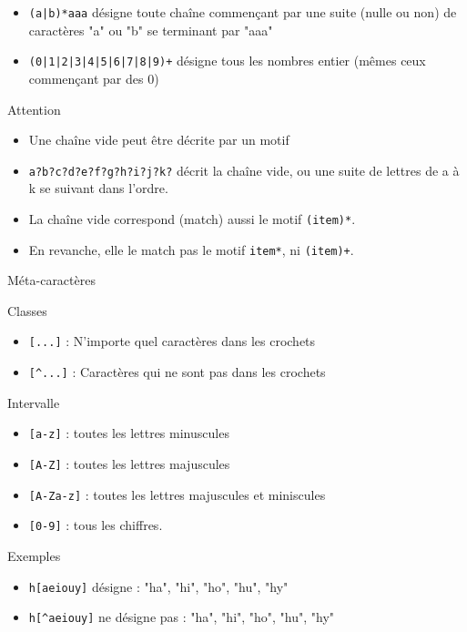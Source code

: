 \begin{frame}[containsverbatim]{\ftitle}
\begin{block}{\blocktitle}
\begin{itemize}
\item \verb!(a|b)*aaa! désigne toute chaîne commençant par une suite (nulle ou non) de caractères "a" ou "b" se terminant par "aaa"
\item \verb!(0|1|2|3|4|5|6|7|8|9)+! désigne tous les nombres entier (mêmes ceux commençant par des 0)
\end{itemize}
\end{block}

\def\blocktitle{Attention}
\begin{alertblock}{\blocktitle}
\begin{itemize}
\item Une chaîne vide peut être décrite par un motif
\item \verb!a?b?c?d?e?f?g?h?i?j?k?! décrit la chaîne vide, ou une suite de lettres de a à k se suivant dans l'ordre.
\item La chaîne vide correspond (match) aussi le motif \verb!(item)*!.
\item En revanche, elle le match pas le motif \verb!item*!, ni \verb!(item)+!.
\end{itemize}
\end{alertblock}
\end{frame}

\def\ftitle{Méta-caractères}
\begin{frame}[containsverbatim]{\ftitle}
\def\blocktitle{Classes}
\begin{block}{\blocktitle}
\begin{itemize}
\item \verb![...]! : N'importe quel caractères dans les crochets
\item \verb![^...]! : Caractères qui ne sont pas dans les crochets
\end{itemize}
\end{block}

\def\blocktitle{Intervalle}
\begin{block}{\blocktitle}
\begin{itemize}
\item \verb![a-z]! : toutes les lettres minuscules
\item \verb![A-Z]! : toutes les lettres majuscules
\item \verb![A-Za-z]! : toutes les lettres majuscules et miniscules
\item \verb![0-9]! : tous les chiffres.
\end{itemize}
\end{block}

\def\blocktitle{Exemples}
\begin{exampleblock}{\blocktitle}
\begin{itemize}
\item \verb!h[aeiouy]! désigne : "ha", "hi", "ho", "hu", "hy"
\item \verb!h[^aeiouy]! ne désigne pas : "ha", "hi", "ho", "hu", "hy"
\end{itemize}
\end{exampleblock}
\end{frame}


